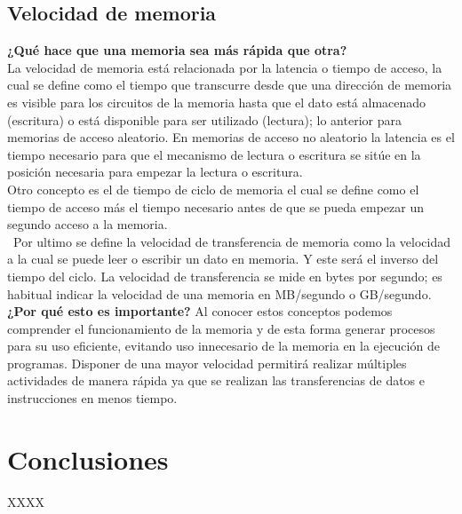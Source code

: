 \documentclass{article}
\begin{document}
\subsection{Velocidad de memoria}
\textbf{¿Qué hace que una memoria sea más rápida que otra?}\\
La velocidad de memoria está relacionada por la latencia o tiempo de acceso, la cual se define como el tiempo que transcurre desde que una dirección de memoria es visible para los circuitos de la memoria hasta que el dato está almacenado (escritura) o está disponible para ser utilizado (lectura); lo anterior para memorias de acceso aleatorio. En memorias de acceso no aleatorio la latencia es el tiempo necesario para que el mecanismo de lectura o escritura se sitúe en la posición necesaria para empezar la lectura o escritura.\cite{Estructura}\\
Otro concepto es el de tiempo de ciclo de memoria el cual se define como el tiempo de acceso más el tiempo necesario antes de que se pueda empezar un segundo acceso a la memoria.\\\
Por ultimo se define la velocidad de transferencia de memoria como la velocidad a la cual se puede leer o escribir un dato en memoria. Y este será el inverso del tiempo del ciclo. La velocidad de transferencia se mide en bytes por segundo; es habitual indicar la velocidad de una memoria en MB/segundo o GB/segundo.\\

\textbf{¿Por qué esto es importante?}
Al conocer estos conceptos podemos comprender el funcionamiento de la memoria y de esta forma generar procesos para su uso eficiente, evitando uso innecesario de la memoria en la ejecución de programas. Disponer de una mayor velocidad permitirá realizar múltiples actividades de manera rápida ya que se realizan las transferencias de datos e instrucciones en menos tiempo. 


\section{Conclusiones} \label{conclusion}
XXXX



\end{document}
